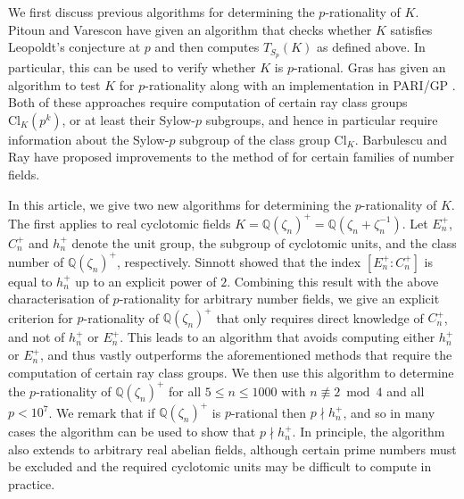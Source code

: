 \documentclass[12pt, a4paper, usenames]{amsart}
\newcommand{\Q}{\mathbb{Q}}
\theoremstyle{plain}
\theoremstyle{remark}
\theoremstyle{definition}
\newcommand{\Cl}{\mathrm{Cl}}
\begin{document}
We first discuss previous algorithms for determining the $p$-rationality
of $K$.
Pitoun and Varescon \cite{MR3266966} have given an algorithm that
checks whether $K$ satisfies 
Leopoldt's conjecture at $p$ and then computes $T_{S_{p}}(K)$ as defined above. 
In particular, this can be used
to verify whether $K$ is $p$-rational.
Gras \cite{MR4491965} has given an algorithm to test $K$ for $p$-rationality 
along with an implementation in PARI/GP \cite{PARI2}.
Both of these approaches require computation of certain
ray class groups $\Cl_{K}(p^{k})$, or at least their Sylow-$p$ subgroups, and 
hence in particular 
require information about the Sylow-$p$ subgroup of the class group $\Cl_{K}$.
Barbulescu and Ray \cite{MR4158582} have proposed improvements to 
the method of \cite{MR3266966} for certain families of number fields.

In this article, we give two new algorithms for determining the $p$-rationality of $K$.
The first applies to real cyclotomic fields $K=\Q(\zeta_{n})^{+}=\Q(\zeta_{n}+\zeta_{n}^{-1})$.
Let $E_{n}^{+}$, $C_{n}^{+}$ and $h_{n}^{+}$ denote the unit group,
the subgroup of cyclotomic units, and the class number of $\Q(\zeta_{n})^{+}$, respectively.
Sinnott \cite{MR485778} showed that the index $[E_{n}^{+} : C_{n}^{+}]$ is equal to 
$h_{n}^{+}$ up to an explicit power of $2$.
Combining this result with the above characterisation of $p$-rationality for 
arbitrary number fields,
we give an explicit criterion for $p$-rationality of $\Q(\zeta_{n})^{+}$
that only requires direct knowledge of $C_{n}^{+}$, and not of $h_{n}^{+}$ or $E_{n}^{+}$. 
This leads to an algorithm that avoids computing either $h_{n}^{+}$ or $E_{n}^{+}$, and 
thus vastly outperforms the aforementioned methods that require the computation of certain ray class groups. 
We then use this algorithm to determine the $p$-rationality of $\Q(\zeta_{n})^{+}$ for all $5 \leq n \leq 1000$ with $n \not\equiv 2 \bmod 4$ and all $p < 10^{7}$.
We remark that if $\Q(\zeta_{n})^{+}$ is $p$-rational then $p \nmid h_{n}^{+}$, 
and so in many cases the algorithm can be used to show that $p \nmid h_{n}^{+}$.
In principle, the algorithm also extends to arbitrary real abelian fields, although certain prime numbers must be excluded and the required cyclotomic units may be difficult to compute in practice.
\end{document}
